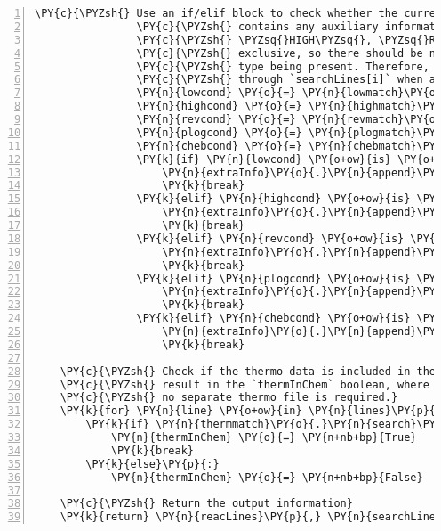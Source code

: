 \begin{Verbatim}[commandchars=\\\{\},fontsize=\small,numbers=left,firstnumber=1,stepnumber=2,firstline=2]
                \PY{c}{\PYZsh{} Use an if/elif block to check whether the current line}
                \PY{c}{\PYZsh{} contains any auxiliary information. The options \PYZsq{}LOW\PYZsq{},}
                \PY{c}{\PYZsh{} \PYZsq{}HIGH\PYZsq{}, \PYZsq{}REV\PYZsq{}, \PYZsq{}PLOG\PYZsq{}, and \PYZsq{}CHEB\PYZsq{} are mutually}
                \PY{c}{\PYZsh{} exclusive, so there should be no chance of a different}
                \PY{c}{\PYZsh{} type being present. Therefore, break out of the loop}
                \PY{c}{\PYZsh{} through `searchLines[i]` when a keyword is found.}
                \PY{n}{lowcond} \PY{o}{=} \PY{n}{lowmatch}\PY{o}{.}\PY{n}{search}\PY{p}{(}\PY{n}{line}\PY{p}{)}
                \PY{n}{highcond} \PY{o}{=} \PY{n}{highmatch}\PY{o}{.}\PY{n}{search}\PY{p}{(}\PY{n}{line}\PY{p}{)}
                \PY{n}{revcond} \PY{o}{=} \PY{n}{revmatch}\PY{o}{.}\PY{n}{search}\PY{p}{(}\PY{n}{line}\PY{p}{)}
                \PY{n}{plogcond} \PY{o}{=} \PY{n}{plogmatch}\PY{o}{.}\PY{n}{search}\PY{p}{(}\PY{n}{line}\PY{p}{)}
                \PY{n}{chebcond} \PY{o}{=} \PY{n}{chebmatch}\PY{o}{.}\PY{n}{search}\PY{p}{(}\PY{n}{line}\PY{p}{)}
                \PY{k}{if} \PY{n}{lowcond} \PY{o+ow}{is} \PY{o+ow}{not} \PY{n+nb+bp}{None}\PY{p}{:}
                    \PY{n}{extraInfo}\PY{o}{.}\PY{n}{append}\PY{p}{(}\PY{l+m+mi}{1}\PY{p}{)}
                    \PY{k}{break}
                \PY{k}{elif} \PY{n}{highcond} \PY{o+ow}{is} \PY{o+ow}{not} \PY{n+nb+bp}{None}\PY{p}{:}
                    \PY{n}{extraInfo}\PY{o}{.}\PY{n}{append}\PY{p}{(}\PY{l+m+mi}{2}\PY{p}{)}
                    \PY{k}{break}
                \PY{k}{elif} \PY{n}{revcond} \PY{o+ow}{is} \PY{o+ow}{not} \PY{n+nb+bp}{None}\PY{p}{:}
                    \PY{n}{extraInfo}\PY{o}{.}\PY{n}{append}\PY{p}{(}\PY{l+m+mi}{3}\PY{p}{)}
                    \PY{k}{break}
                \PY{k}{elif} \PY{n}{plogcond} \PY{o+ow}{is} \PY{o+ow}{not} \PY{n+nb+bp}{None}\PY{p}{:}
                    \PY{n}{extraInfo}\PY{o}{.}\PY{n}{append}\PY{p}{(}\PY{l+m+mi}{4}\PY{p}{)}
                    \PY{k}{break}
                \PY{k}{elif} \PY{n}{chebcond} \PY{o+ow}{is} \PY{o+ow}{not} \PY{n+nb+bp}{None}\PY{p}{:}
                    \PY{n}{extraInfo}\PY{o}{.}\PY{n}{append}\PY{p}{(}\PY{l+m+mi}{5}\PY{p}{)}
                    \PY{k}{break}

    \PY{c}{\PYZsh{} Check if the thermo data is included in the chemistry. Store the}
    \PY{c}{\PYZsh{} result in the `thermInChem` boolean, where `True` indicates that}
    \PY{c}{\PYZsh{} no separate thermo file is required.}
    \PY{k}{for} \PY{n}{line} \PY{o+ow}{in} \PY{n}{lines}\PY{p}{:}
        \PY{k}{if} \PY{n}{thermmatch}\PY{o}{.}\PY{n}{search}\PY{p}{(}\PY{n}{line}\PY{p}{)} \PY{o+ow}{is} \PY{o+ow}{not} \PY{n+nb+bp}{None}\PY{p}{:}
            \PY{n}{thermInChem} \PY{o}{=} \PY{n+nb+bp}{True}
            \PY{k}{break}
        \PY{k}{else}\PY{p}{:}
            \PY{n}{thermInChem} \PY{o}{=} \PY{n+nb+bp}{False}

    \PY{c}{\PYZsh{} Return the output information}
    \PY{k}{return} \PY{n}{reacLines}\PY{p}{,} \PY{n}{searchLines}\PY{p}{,} \PY{n}{extraInfo}\PY{p}{,} \PY{n}{thermInChem}\PY{p}{,}
\end{Verbatim}
